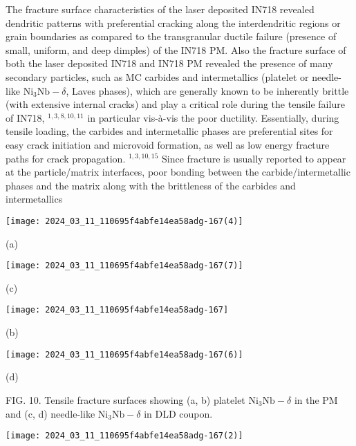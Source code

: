 \documentclass[10pt]{article}
\begin{document}
The fracture surface characteristics of the laser deposited IN718 revealed dendritic patterns with preferential cracking along the interdendritic regions or grain boundaries as compared to the transgranular ductile failure (presence of small, uniform, and deep dimples) of the IN718 PM. Also the fracture surface of both the laser deposited IN718 and IN718 PM revealed the presence of many secondary particles, such as MC carbides and intermetallics (platelet or needle-like $\mathrm{Ni}_{3} \mathrm{Nb}-\delta$, Laves phases), which are generally known to be inherently brittle (with extensive internal cracks) and play a critical role during the tensile failure of IN718, ${ }^{1,3,8,10,11}$ in particular vis-à-vis the poor ductility. Essentially, during tensile loading, the carbides and intermetallic phases are preferential sites for easy crack initiation and microvoid formation, as well as low energy fracture paths for crack propagation. ${ }^{1,3,10,15}$ Since fracture is usually reported to appear at the particle/matrix interfaces, poor bonding between the carbide/intermetallic phases and the matrix along with the brittleness of the carbides and intermetallics

\begin{center}
\texttt{[image: 2024\_03\_11\_110695f4abfe14ea58adg-167(4)]}
\end{center}

(a)

\begin{center}
\texttt{[image: 2024\_03\_11\_110695f4abfe14ea58adg-167(7)]}
\end{center}

(c)

\begin{center}
\texttt{[image: 2024\_03\_11\_110695f4abfe14ea58adg-167]}
\end{center}

(b)

\begin{center}
\texttt{[image: 2024\_03\_11\_110695f4abfe14ea58adg-167(6)]}
\end{center}

(d)

FIG. 10. Tensile fracture surfaces showing (a, b) platelet $\mathrm{Ni}_{3} \mathrm{Nb}-\delta$ in the PM and (c, d) needle-like $\mathrm{Ni}_{3} \mathrm{Nb}-\delta$ in DLD coupon.

\begin{center}
\texttt{[image: 2024\_03\_11\_110695f4abfe14ea58adg-167(2)]}
\end{center}
\end{document}
